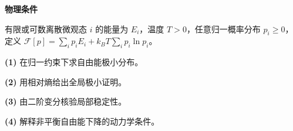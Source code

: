 \textbf{物理条件}\par 有限或可数离散微观态 \(i\) 的能量为 \(E_i\)，温度 \(T>0\)，任意归一概率分布 \(p_i\ge0\)，定义 \(\mathcal F[p]=\sum_i p_iE_i+k_BT\sum_i p_i\ln p_i\)。
\par\noindent\textbf{(1)} 在归一约束下求自由能极小分布。
\par\noindent\textbf{(2)} 用相对熵给出全局极小证明。
\par\noindent\textbf{(3)} 由二阶变分核验局部稳定性。
\par\noindent\textbf{(4)} 解释非平衡自由能下降的动力学条件。
